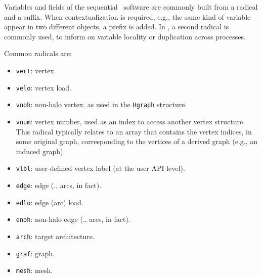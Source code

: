 Variables and fields of the sequential \scotch\ software are commonly
built from a radical and a suffix. When contextualization is required,
e.g., the same kind of variable appear in two different objects, a
prefix is added. In \ptscotch, a second radical is commonly used, to
inform on variable locality or duplication across processes.

Common radicals are:
\begin{itemize}
\item
\texttt{vert}: vertex.
\item
\texttt{velo}: vertex load.
\item
\texttt{vnoh}: non-halo vertex, as used in the \texttt{Hgraph}
structure.
\item
\texttt{vnum}: vertex number, used as an index to access another vertex
structure. This radical typically relates to an array that contains
the vertex indices, in some original graph, corresponding to the
vertices of a derived graph (e.g., an induced graph).
\item
\texttt{vlbl}: user-defined vertex label (at the user API level).
\item
\texttt{edge}: edge (\ie., arcs, in fact).
\item
\texttt{edlo}: edge (arc) load.
\item
\texttt{enoh}: non-halo edge (\ie., arcs, in fact).
\item
\texttt{arch}: target architecture.
\item
\texttt{graf}: graph.
\item
\texttt{mesh}: mesh.
\end{itemize}

